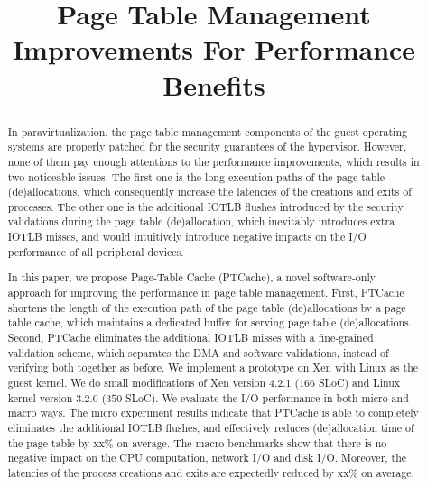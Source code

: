 \documentclass[10pt]{sigplanconf}
\begin{document}
\newcommand{\name}{PTCache\xspace}
\newcommand{\eat}[1]{}  %
\newcommand{\authcomment}[3]{\textcolor{#3}{#1 says: #2}}\newcommand{\yueqiang}[1]{\authcomment{Yueqiang}{#1}{red}}
\newcommand{\zhi}[1]{\authcomment{Zhi}{#1}{red}}
 \newcommand{\mypara}[1]{\vspace{2pt}\noindent\textbf{{#1. }}}


\date{}

\title{\Large \bf Page Table Management Improvements For Performance Benefits }


\maketitle


\begin{abstract}
In paravirtualization, the page table management components of the guest operating systems are properly patched for the security guarantees of the hypervisor.
However, none of them pay enough attentions to the performance improvements, which results in two noticeable issues.
The first one is the long execution paths of the page table (de)allocations, which consequently increase the latencies of the creations and exits of processes.
The other one is the additional IOTLB flushes introduced by the security validations during the page table (de)allocation, which inevitably introduces extra IOTLB misses, and would intuitively introduce negative impacts on the I/O performance of all peripheral devices.


In this paper, we propose Page-Table Cache (\name), a novel software-only approach for improving the performance in page table management.
First, \name shortens the length of the execution path of the page table (de)allocations by a page table cache, which maintains a dedicated buffer for serving page table (de)allocations.
Second, \name eliminates the additional IOTLB misses with a fine-grained validation scheme, which separates the DMA and software validations, instead of verifying both together as before.
We implement a prototype on Xen with Linux as the guest kernel. We do small modifications of Xen version 4.2.1 ($166$ SLoC) and Linux kernel version 3.2.0 ($350$ SLoC).
We evaluate the I/O performance in both micro and macro ways.
The micro experiment results indicate that \name is able to completely eliminates the additional IOTLB flushes, and effectively reduces (de)allocation time of the page table by xx\% on average. 
The macro benchmarks show that there is no negative impact on the CPU computation, network I/O and disk I/O. 
Moreover, the latencies of the process creations and exits are expectedly reduced by xx\% on average. 
\end{abstract}
\end{document}
